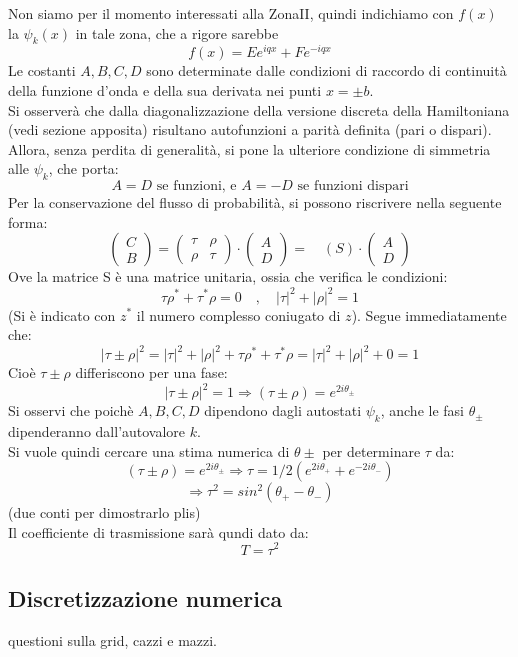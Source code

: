 \bigskip
Non siamo per il momento interessati alla ZonaII, quindi indichiamo con
$f(x)$ la $\psi_k(x)$ in tale zona, che a rigore sarebbe
    $$f(x)= Ee^{iqx}+Fe^{-iqx}$$
Le costanti $A,B,C,D$ sono determinate dalle condizioni di raccordo di continuità della
funzione d'onda e della sua derivata nei punti $x=\pm b$.\\
Si osserverà che dalla diagonalizzazione della versione discreta della Hamiltoniana
(vedi sezione apposita) risultano autofunzioni a parità definita (pari o dispari).
Allora, senza perdita di generalità, si pone la ulteriore condizione di simmetria alle $\psi_k$, che porta:
    $$ A = D \mbox{ se funzioni, e } A = -D \mbox{ se funzioni dispari}$$
Per la conservazione del flusso di probabilità, si possono riscrivere nella seguente forma:
$$
    \begin{pmatrix} C \\ B \end{pmatrix} =
    \begin{pmatrix} \tau & \rho \\ \rho & \tau \end{pmatrix} \cdot
    \begin{pmatrix} A \\ D \end{pmatrix} = \quad (S)\cdot \begin{pmatrix} A \\ D \end{pmatrix}
$$
Ove la matrice S è una matrice unitaria, ossia che verifica le condizioni:
$$ \tau\rho^* + \tau^*\rho = 0 \quad,\quad |\tau|^2 + |\rho|^2 = 1$$
(Si è indicato con $z^*$ il numero complesso coniugato di $z$). Segue immediatamente che:
$$ |\tau \pm \rho|^2 = |\tau|^2 + |\rho|^2 + \tau\rho^* + \tau^*\rho = |\tau|^2 + |\rho|^2 + 0 = 1$$
Cioè $\tau \pm \rho$ differiscono per una fase:
$$ |\tau \pm \rho|^2 = 1 \Rightarrow (\tau \pm \rho) = e^{2i\theta_\pm}$$
Si osservi che poichè $A,B,C,D$ dipendono dagli autostati $\psi_k$, anche le fasi $\theta_\pm$ dipenderanno dall'autovalore $k$.\\
Si vuole quindi cercare una stima numerica di $\theta\pm$ per determinare $\tau$ da:
    $$ (\tau \pm \rho) = e^{2i\theta_\pm} \Rightarrow \tau = 1/2(e^{2i\theta_+}+e^{-2i\theta_-})$$
    $$ \Rightarrow \tau^2 = sin^2(\theta_+ - \theta_-)$$
(due conti per dimostrarlo plis)
\\
Il coefficiente di trasmissione sarà qundi dato da:
    $$T = \tau^2$$

\subsection*{Discretizzazione numerica}
questioni sulla grid, cazzi e mazzi.
